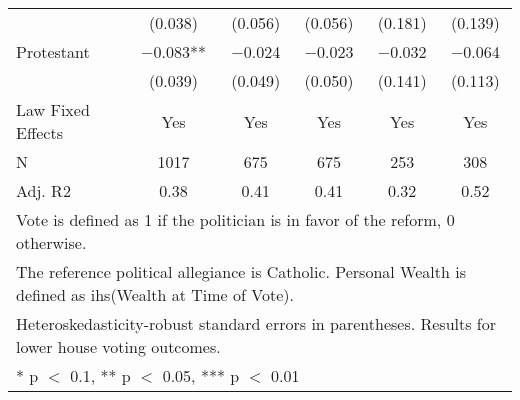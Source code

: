 \begin{table}
\begin{tabular}[t]{lccccc}
 & (\num{0.038}) & (\num{0.056}) & (\num{0.056}) & (\num{0.181}) & (\num{0.139})\\
Protestant & \num{-0.083}** & \num{-0.024} & \num{-0.023} & \num{-0.032} & \num{-0.064}\\
 & (\num{0.039}) & (\num{0.049}) & (\num{0.050}) & (\num{0.141}) & (\num{0.113})\\
\midrule
Law Fixed Effects & Yes & Yes & Yes & Yes & Yes\\
N & \num{1017} & \num{675} & \num{675} & \num{253} & \num{308}\\
Adj. R2 & \num{0.38} & \num{0.41} & \num{0.41} & \num{0.32} & \num{0.52}\\
\bottomrule
\multicolumn{6}{l}{\rule{0pt}{1em}Vote is defined as 1 if the politician is in favor of the reform, 0 otherwise.}\\
\multicolumn{6}{l}{\rule{0pt}{1em}The reference political allegiance is Catholic. Personal Wealth is defined as ihs(Wealth at Time of Vote).}\\
\multicolumn{6}{l}{\rule{0pt}{1em}Heteroskedasticity-robust standard errors in parentheses. Results for lower house voting outcomes.}\\
\multicolumn{6}{l}{\rule{0pt}{1em}* p $<$ 0.1, ** p $<$ 0.05, *** p $<$ 0.01}\\
\end{tabular}
\end{table}
